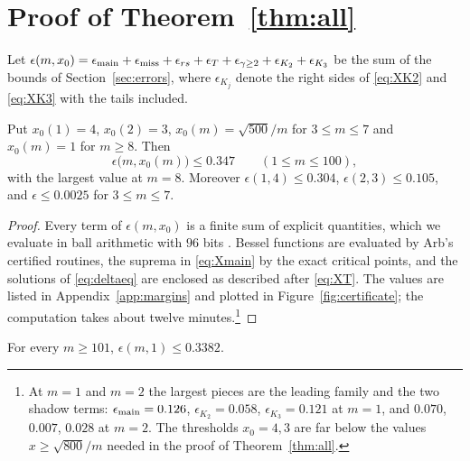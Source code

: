 \section{Proof of Theorem~\ref{thm:all}}\label{sec:proofall}

Let $\epsilon(m,x_0)=\epsilon_{\rm main}+\epsilon_{\rm miss}+\epsilon_{rs}+\epsilon_T+\epsilon_{\gamma\ge2}+\epsilon_{K_2}+\epsilon_{K_3}$ be the sum of the bounds of Section~\ref{sec:errors}, where $\epsilon_{K_j}$ denote the right sides of \eqref{eq:XK2} and \eqref{eq:XK3} with the tails included.

\begin{theorem}\label{thm:cert}
Put $x_0(1)=4$, $x_0(2)=3$, $x_0(m)=\sqrt{500}/m$ for $3\le m\le7$ and $x_0(m)=1$ for $m\ge8$. Then
\[
\epsilon\big(m,x_0(m)\big)\le0.347\qquad(1\le m\le100),
\]
with the largest value at $m=8$. Moreover $\epsilon(1,4)\le0.304$, $\epsilon(2,3)\le0.105$, and $\epsilon\le0.0025$ for $3\le m\le7$.
\end{theorem}

\begin{proof}
Every term of $\epsilon(m,x_0)$ is a finite sum of explicit quantities, which we evaluate in ball arithmetic with $96$ bits \cite{Joh17}. Bessel functions are evaluated by Arb's certified routines, the suprema in \eqref{eq:Xmain} by the exact critical points, and the solutions of \eqref{eq:deltaeq} are enclosed as described after \eqref{eq:XT}. The values are listed in Appendix~\ref{app:margins} and plotted in Figure~\ref{fig:certificate}; the computation takes about twelve minutes.\footnote{At $m=1$ and $m=2$ the largest pieces are the leading family and the two shadow terms: $\epsilon_{\rm main}=0.126$, $\epsilon_{K_2}=0.058$, $\epsilon_{K_3}=0.121$ at $m=1$, and $0.070$, $0.007$, $0.028$ at $m=2$. The thresholds $x_0=4,3$ are far below the values $x\ge\sqrt{800}/m$ needed in the proof of Theorem~\ref{thm:all}.}
\end{proof}

\begin{theorem}\label{thm:analytic}
For every $m\ge101$, $\epsilon(m,1)\le0.3382$.
\end{theorem}

